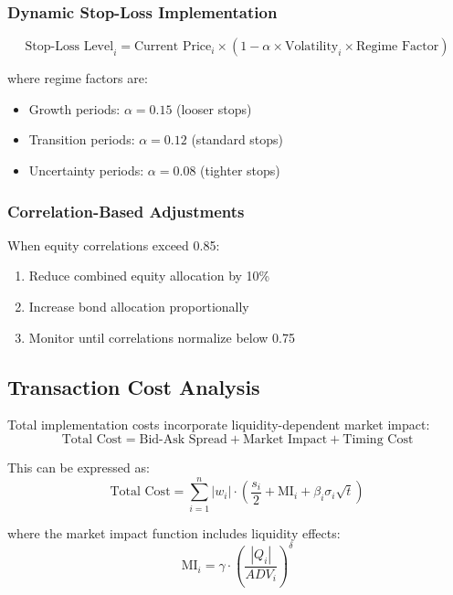 \documentclass[onecolumn,11pt]{IEEEtran}
\begin{document}
\subsubsection{Dynamic Stop-Loss Implementation}
\begin{equation}
\text{Stop-Loss Level}_i = \text{Current Price}_i \times (1 - \alpha \times \text{Volatility}_i \times \text{Regime Factor})
\end{equation}

where regime factors are:
\begin{itemize}
    \item Growth periods: $\alpha = 0.15$ (looser stops)
    \item Transition periods: $\alpha = 0.12$ (standard stops)
    \item Uncertainty periods: $\alpha = 0.08$ (tighter stops)
\end{itemize}

\subsubsection{Correlation-Based Adjustments}
When equity correlations exceed 0.85:
\begin{enumerate}
    \item Reduce combined equity allocation by 10\%
    \item Increase bond allocation proportionally
    \item Monitor until correlations normalize below 0.75
\end{enumerate}

\subsection{Transaction Cost Analysis}

Total implementation costs incorporate liquidity-dependent market impact:
\begin{equation}
\text{Total Cost} = \text{Bid-Ask Spread} + \text{Market Impact} + \text{Timing Cost}
\end{equation}

This can be expressed as:
\begin{equation}
\text{Total Cost} = \sum_{i=1}^n |w_i| \cdot \left(\frac{s_i}{2} + \text{MI}_i + \beta_i \sigma_i \sqrt{t}\right)
\end{equation}

where the market impact function includes liquidity effects:
\begin{equation}
\text{MI}_i = \gamma \cdot \left(\frac{|Q_i|}{ADV_i}\right)^\delta
\end{equation}
\end{document}
